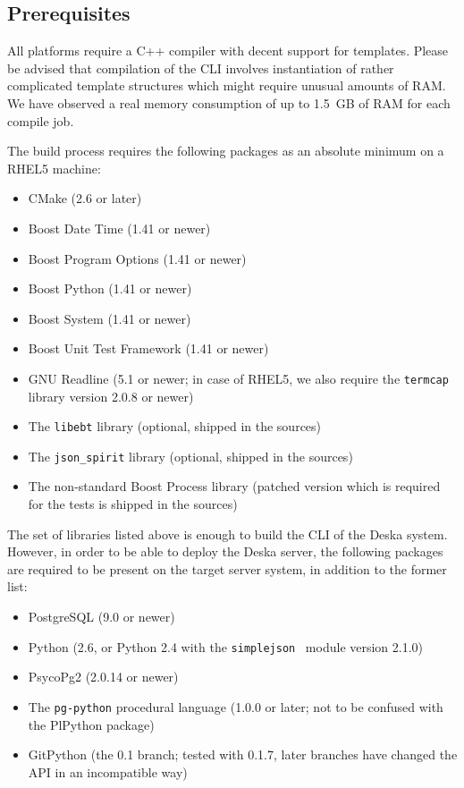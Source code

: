 \documentclass[deska]{subfiles}
\begin{document}
\subsection{Prerequisites}

All platforms require a C++ compiler with decent support for templates.  Please be advised that compilation of the CLI
involves instantiation of rather complicated template structures which might require unusual amounts of RAM.  We have
observed a real memory consumption of up to 1.5~GB of RAM for each compile job.

The build process requires the following packages as an absolute minimum on a RHEL5 machine:

\begin{itemize}
    \item CMake (2.6 or later)~\cite{cmake}
    \item Boost Date Time (1.41 or newer)~\cite{boost}
    \item Boost Program Options (1.41 or newer)
    \item Boost Python (1.41 or newer)
    \item Boost System (1.41 or newer)
    \item Boost Unit Test Framework (1.41 or newer)
    \item GNU Readline (5.1 or newer; in case of RHEL5, we also require the {\tt termcap} library version 2.0.8 or
        newer)~\cite{gnu-readline}
    \item The {\tt libebt} library (optional, shipped in the sources)~\cite{libebt}
    \item The {\tt json\_spirit} library (optional, shipped in the sources)~\cite{json-spirit}
    \item The non-standard Boost Process library (patched version which is required for the tests is shipped in the
        sources)~\cite{boost-process}
\end{itemize}

The set of libraries listed above is enough to build the CLI of the Deska system.  However, in order to be able to
deploy the Deska server, the following packages are required to be present on the target server system, in addition to
the former list:

\begin{itemize}
    \item PostgreSQL (9.0 or newer)~\cite{postgresql}
    \item Python (2.6, or Python 2.4 with the {\tt simplejson}~\cite{simplejson} module version 2.1.0)~\cite{python}
    \item PsycoPg2 (2.0.14 or newer)~\cite{psycopg}
    \item The {\tt pg-python} procedural language (1.0.0 or later; not to be confused with the PlPython
        package)~\cite{pg-python}
    \item GitPython (the 0.1 branch; tested with 0.1.7, later branches have changed the API in an incompatible
        way)~\cite{git-python}
\end{itemize}
\end{document}
